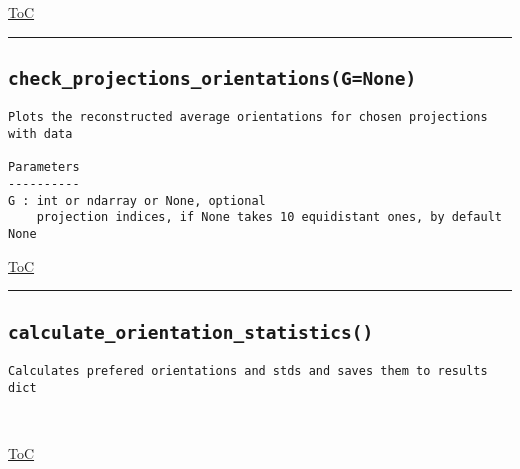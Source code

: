 \documentclass{article}
\begin{document}
\begin{flushright}

\hyperref[toc]{ToC}

\end{flushright}



\vspace{5mm}

\hrule

\subsection*{\texttt{check\_projections\_orientations(G=None)}}

\begin{lstlisting}[language=docstring]
Plots the reconstructed average orientations for chosen projections with data

Parameters
----------
G : int or ndarray or None, optional
    projection indices, if None takes 10 equidistant ones, by default None
\end{lstlisting}

\begin{flushright}

\hyperref[toc]{ToC}

\end{flushright}



\vspace{5mm}

\hrule

\subsection*{\texttt{calculate\_orientation\_statistics()}}

\begin{lstlisting}[language=docstring]
Calculates prefered orientations and stds and saves them to results dict

    
\end{lstlisting}

\begin{flushright}

\hyperref[toc]{ToC}

\end{flushright}
\end{document}
